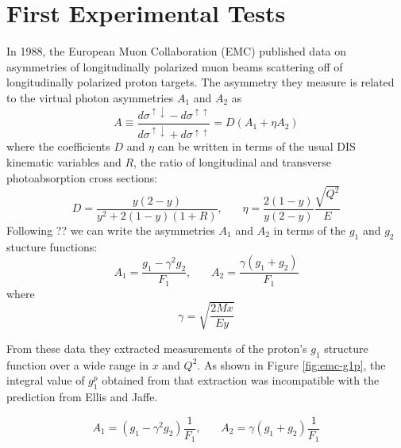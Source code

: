 \section{First Experimental Tests}


In 1988, the European Muon Collaboration (EMC) published data on asymmetries of longitudinally polarized muon beams scattering off of longitudinally polarized proton targets.  The asymmetry they measure is related to the virtual photon asymmetries $A_1$ and $A_2$ as
%
\begin{equation}
  A \equiv \frac{d\sigma^{\uparrow \downarrow} - d\sigma^{\uparrow \uparrow}}{d\sigma^{\uparrow \downarrow} + d\sigma^{\uparrow \uparrow}} = D (A_1 + \eta A_2)
\end{equation}
%
where the coefficients $D$ and $\eta$ can be written in terms of the usual DIS kinematic variables and $R$, the ratio of longitudinal and transverse photoabsorption cross sections:
%
\begin{equation}
  D = \frac{y(2-y)}{y^2 + 2(1-y)(1+R)}, ~~~~~~~~ \eta = \frac{2(1-y)}{y(2-y)} \frac{\sqrt{Q^2}}{E}
\end{equation}
%
Following ?? \cite{??} we can write the asymmetries $A_1$ and $A_2$ in terms of the $g_1$ and $g_2$ stucture functions:
\begin{equation}
  A_1 = \frac{g_1 - \gamma^2 g_2}{F_1}, ~~~~~~~~ A_2 = \frac{\gamma (g_1 + g_2)}{F_1}
\end{equation}
%
where
%
\begin{equation}
  \gamma = \sqrt{\frac{2Mx}{Ey}}
\end{equation}


From these data they extracted measurements of the proton's $g_1$ structure function over a wide range in $x$ and $Q^2$.  As shown in Figure \ref{fig:emc-g1p}, the integral value of $g_1^p$ obtained from that extraction was incompatible with the prediction from Ellis and Jaffe.



\begin{equation}
  A_1 = (g_1 - \gamma^2 g_2)\frac{1}{F_1}, ~~~~~~~~ A_2 = \gamma(g_1+g_2)\frac{1}{F_1}
\end{equation}

